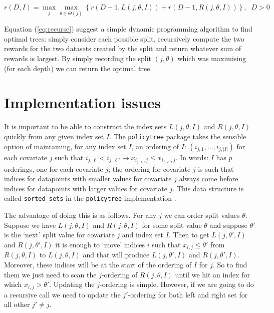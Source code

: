 \documentclass{article}
\newcommand{\splitval}{\ensuremath{\theta}}
\newcommand{\splitvals}{\ensuremath{\Theta}}
\newcommand{\depth}{\ensuremath{D}}
\begin{document}
\begin{equation}
  \label{eq:recurse}
  r(\depth,I) = \max_{j} \max_{\splitval \in \splitvals(j)} \left\{ r(\depth-1,L(j,\splitval,I))
  + r(\depth-1,R(j,\splitval,I))\right\}, \;\; \depth > 0 
\end{equation}

Equation (\ref{eq:recurse}) suggest a simple dynamic programming
algorithm to find optimal trees: simply consider each possible split,
recursively compute the two rewards for the two datasets created by the
split and return whatever sum of rewards is largest. By simply
recording the split $(j,\splitval)$ which was maximising (for each
depth) we can return the optimal tree.

\section{Implementation issues}
\label{sec:implementation}

It is important to be able to construct the index sets
$L(j,\splitval,I)$ and $R(j,\splitval,I)$ quickly from any given index
set $I$. The \texttt{policytree} package takes the sensible option of
maintaining, for any index set $I$, an ordering of $I$:
$(i_{j,1}, \dots, i_{j,|I|})$ for each covariate $j$ such that
$i_{j,\ell} < i_{j,\ell'} \rightarrow x_{i_{j,\ell},j} \leq
x_{i_{j,\ell'},j}$. In words: $I$ has $p$ orderings, one for each
covariate $j$; the ordering for covariate $j$ is such that indices for
datapoints with smaller values for covariate $j$ always come before
indices for datapoints with larger values for covariate $j$. This data
structure is called \texttt{sorted\_sets} in the \texttt{policytree}
implementation \cite{sverdrup2020}.



The advantage of doing this is as follows. For any $j$
we can order split values $\theta$. Suppose we have $L(j,\splitval,I)$
and $R(j,\splitval,I)$ for some split value $\splitval$ and suppose
$\splitval'$ is the `next' split value for covariate $j$ and index set
$I$. Then to get
$L(j,\splitval',I)$ and $R(j,\splitval',I)$ it is enough to `move'
indices $i$ such that $x_{i,j} \leq \splitval'$ from $R(j,\splitval,I)$
to $L(j,\splitval,I)$ and that will produce $L(j,\splitval',I)$ and
$R(j,\splitval',I)$. Moreover, these indices will be at the start of
the ordering of $I$ for $j$. So to find them we just need to scan the
$j$-ordering of $R(j,\splitval,I)$ until we hit an index for which
$x_{i,j} > \splitval'$. Updating the $j$-ordering is
simple. However, if we are going to do a recursive call we need to
update the $j'$-ordering for both left and right set for all other $j'
\neq j$.
\end{document}
